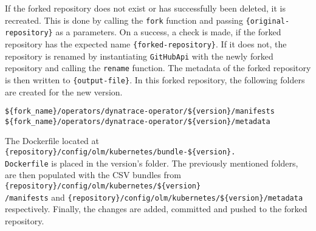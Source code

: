 If the forked repository does not exist or has successfully been deleted, it is recreated.
This is done by calling the \verb|fork| function and passing \verb|{original-repository}| as a parameters.
On a success, a check is made, if the forked repository has the expected name \verb|{forked-repository}|.
If it does not, the repository is renamed by instantiating \verb|GitHubApi| with the newly forked repository and calling the \verb|rename| function.
The metadata of the forked repository is then written to \verb|{output-file}|.
In this forked repository, the following folders are created for the new version.

\begin{verbatim}
${fork_name}/operators/dynatrace-operator/${version}/manifests
${fork_name}/operators/dynatrace-operator/${version}/metadata
\end{verbatim}

The Dockerfile located at \verb|{repository}/config/olm/kubernetes/bundle-${version}.|\\\verb|Dockerfile| is placed in the version's folder.
The previously mentioned folders, are then populated with the CSV bundles from \verb|{repository}/config/olm/kubernetes/${version}|\\\verb|/manifests| and \verb|{repository}/config/olm/kubernetes/${version}/metadata| respectively.
Finally, the changes are added, committed and pushed to the forked repository.
